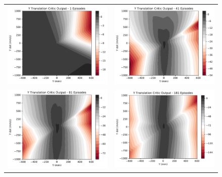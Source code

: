 \begin{figure}[H]
	\begin{tabular}{cc}
		\includegraphics[width=65mm]{figures/train_figs/transy_critic/Critic2_1.pdf} &  
		\includegraphics[width=65mm]{figures/train_figs/transy_critic/Critic2_41.pdf} \\
		\includegraphics[width=65mm]{figures/train_figs/transy_critic/Critic2_81.pdf} &   \includegraphics[width=65mm]{figures/train_figs/transy_critic/Critic2_181.pdf} \\

\end{tabular}
\end{figure}
